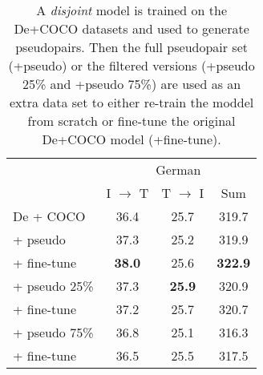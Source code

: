 
\begin{table}[t]
    \centering
    \renewcommand{\arraystretch}{1.0}
    \begin{tabular}{lccc}
        \toprule
         & \multicolumn{3}{c}{German}\\
         & I $\rightarrow$ T & T $\rightarrow$ I & Sum\\
         \midrule
         De + COCO &  36.4  & 25.7 & 319.7\\
         \: \: + pseudo &  37.3 & 25.2 &  319.9\\
          \: \: \: + fine-tune &  \textbf{38.0} & 25.6 & \textbf{322.9}\\
          \: \: + pseudo 25\% &  37.3 & \textbf{25.9}  &  320.9\\
          \: \: \: + fine-tune &  37.2 & 25.7 &  320.7 \\
          \: \: + pseudo 75\% & 36.8  & 25.1 &  316.3\\
          \: \: \: + fine-tune &  36.5  & 25.5 &  317.5 \\

         \bottomrule
    \end{tabular}
    \caption{A \emph{disjoint} model is trained on the De+COCO datasets and used
    to generate pseudopairs. Then the full pseudopair set (+pseudo) or the filtered versions (+pseudo 25\% and +pseudo 75\%) are used as an extra data set to either re-train the moddel from scratch or fine-tune the original De+COCO model (+fine-tune).}
    \label{tab:gerpseudodisjoint}
\end{table}

